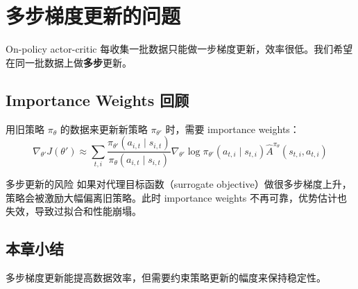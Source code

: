 \section{多步梯度更新的问题}

On-policy actor-critic 每收集一批数据只能做一步梯度更新，效率很低。我们希望在同一批数据上做\textbf{多步}更新。

\subsection{Importance Weights 回顾}

用旧策略 $\pi_\theta$ 的数据来更新新策略 $\pi_{\theta'}$ 时，需要 importance weights：
$$\nabla_{\theta'} J(\theta') \approx \sum_{t,i} \frac{\pi_{\theta'}(a_{i,t} \mid s_{i,t})}{\pi_\theta(a_{i,t} \mid s_{i,t})} \nabla_{\theta'} \log \pi_{\theta'}(a_{t,i} \mid s_{t,i}) \hat{A}^{\pi_\theta}(s_{t,i}, a_{t,i})$$

\begin{warningbox}{多步更新的风险}
如果对代理目标函数（surrogate objective）做很多步梯度上升，策略会被激励大幅偏离旧策略。此时 importance weights 不再可靠，优势估计也失效，导致过拟合和性能崩塌。
\end{warningbox}

\subsection{本章小结}

多步梯度更新能提高数据效率，但需要约束策略更新的幅度来保持稳定性。

